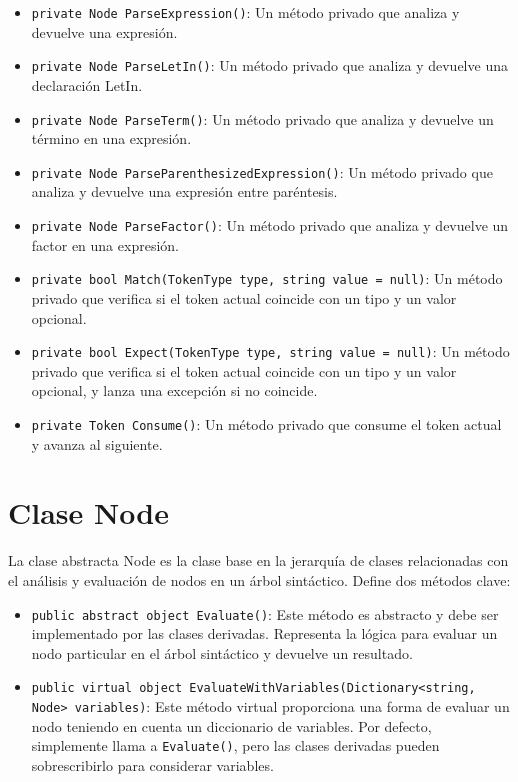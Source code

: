 \documentclass{article}
\begin{document}
\begin{itemize}[left=0pt]
    \item \textcolor{methodcolor}{\lstinline{private Node ParseExpression()}}: Un método privado que analiza y devuelve una expresión.

    \item \textcolor{methodcolor}{\lstinline{private Node ParseLetIn()}}: Un método privado que analiza y devuelve una declaración \textcolor{classcolor}{LetIn}.

    \item \textcolor{methodcolor}{\lstinline{private Node ParseTerm()}}: Un método privado que analiza y devuelve un término en una expresión.

    \item \textcolor{methodcolor}{\lstinline{private Node ParseParenthesizedExpression()}}: Un método privado que analiza y devuelve una expresión entre paréntesis.

    \item \textcolor{methodcolor}{\lstinline{private Node ParseFactor()}}: Un método privado que analiza y devuelve un factor en una expresión.

    \item \textcolor{methodcolor}{\lstinline{private bool Match(TokenType type, string value = null)}}: Un método privado que verifica si el token actual coincide con un tipo y un valor opcional.

    \item \textcolor{methodcolor}{\lstinline{private bool Expect(TokenType type, string value = null)}}: Un método privado que verifica si el token actual coincide con un tipo y un valor opcional, y lanza una excepción si no coincide.

    \item \textcolor{methodcolor}{\lstinline{private Token Consume()}}: Un método privado que consume el token actual y avanza al siguiente.

\end{itemize}
\section{Clase \textcolor{classcolor}{Node}}

La clase abstracta \textcolor{classcolor}{Node} es la clase base en la jerarquía de clases relacionadas con el análisis y evaluación de nodos en un árbol sintáctico. Define dos métodos clave:

\begin{itemize}
    \item \lstinline{public abstract object Evaluate()}: Este método es abstracto y debe ser implementado por las clases derivadas. Representa la lógica para evaluar un nodo particular en el árbol sintáctico y devuelve un resultado.

    \item \lstinline{public virtual object EvaluateWithVariables(Dictionary<string, Node> variables)}: Este método virtual proporciona una forma de evaluar un nodo teniendo en cuenta un diccionario de variables. Por defecto, simplemente llama a \lstinline{Evaluate()}, pero las clases derivadas pueden sobrescribirlo para considerar variables.

\end{itemize}
\end{document}
